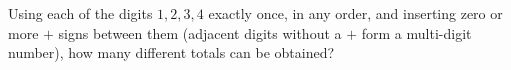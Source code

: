 Using each of the digits $1,2,3,4$ exactly once, in any order, and inserting zero or more $+$ signs between them (adjacent digits without a $+$ form a multi-digit number), how many different totals can be obtained?
